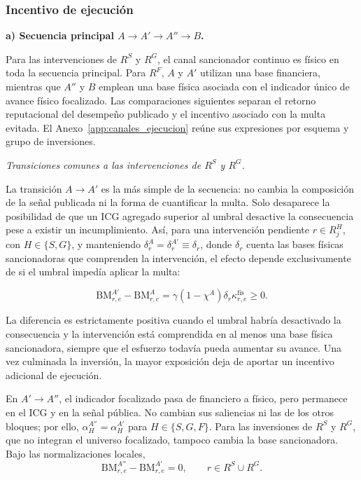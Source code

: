 \subsubsection{Incentivo de ejecución}

\medskip
\noindent\textbf{a) Secuencia principal \(A\to A'\to A''\to B\).}
\par\smallskip

Para las intervenciones de \(R^{S}\) y \(R^{G}\), el canal sancionador continuo es físico en toda la secuencia principal. Para \(R^{F}\), \(A\) y \(A'\) utilizan una base financiera, mientras que \(A''\) y \(B\) emplean una base física asociada con el indicador único de avance físico focalizado. Las comparaciones siguientes separan el retorno reputacional del desempeño publicado y el incentivo asociado con la multa evitada. El Anexo~\ref{app:canales_ejecucion} reúne sus expresiones por esquema y grupo de inversiones.

\medskip
\noindent\textbullet\enspace\textit{Transiciones comunes a las intervenciones de \(R^{S}\) y \(R^{G}\).}
\par\smallskip

La transición \(A\to A'\) es la más simple de la secuencia: no cambia la composición de la señal publicada ni la forma de cuantificar la multa. Solo desaparece la posibilidad de que un ICG agregado superior al umbral desactive la consecuencia pese a existir un incumplimiento. Así, para una intervención pendiente \(r\in R_j^{H}\), con \(H\in\{S,G\}\), y manteniendo \(\delta_r^{A}=\delta_r^{A'}\equiv\delta_r\), donde \(\delta_r\) cuenta las bases físicas sancionadoras que comprenden la intervención, el efecto depende exclusivamente de si el umbral impedía aplicar la multa:

\begin{equation}
\label{eq:diferencia_ejecucion_a_ap_rh}
\mathrm{BM}_{r,e}^{A'}
-
\mathrm{BM}_{r,e}^{A}
=
\gamma
(1-\chi^A)
\delta_r
\kappa_{r,e}^{\mathrm{fis}}
\geq
0.
\end{equation}

La diferencia es estrictamente positiva cuando el umbral habría desactivado la consecuencia y la intervención está comprendida en al menos una base física sancionadora, siempre que el esfuerzo todavía pueda aumentar su avance. Una vez culminada la inversión, la mayor exposición deja de aportar un incentivo adicional de ejecución.

En \(A'\to A''\), el indicador focalizado pasa de financiero a físico, pero permanece en el ICG y en la señal pública. No cambian sus saliencias ni las de los otros bloques; por ello, \(\alpha_H^{A''}=\alpha_H^{A'}\) para \(H\in\{S,G,F\}\). Para las inversiones de \(R^S\) y \(R^G\), que no integran el universo focalizado, tampoco cambia la base sancionadora. Bajo las normalizaciones locales,
\begin{equation}
\label{eq:diferencia_ejecucion_ap_app_rh}
\mathrm{BM}_{r,e}^{A''}-\mathrm{BM}_{r,e}^{A'}=0,
\qquad r\in R^S\cup R^G.
\end{equation}

